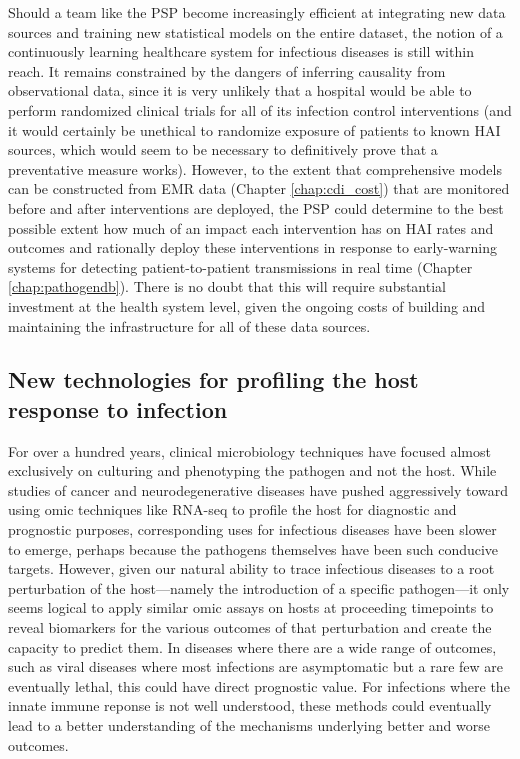 Should a team like the PSP become increasingly efficient at integrating new data sources and training new statistical models on the entire dataset, the notion of a continuously learning healthcare system for infectious diseases is still within reach. It remains constrained by the dangers of inferring causality from observational data,\autocite{Dahabreh2014} since it is very unlikely that a hospital would be able to perform randomized clinical trials for all of its infection control interventions (and it would certainly be unethical to randomize exposure of patients to known HAI sources, which would seem to be necessary to definitively prove that a preventative measure works). However, to the extent that comprehensive models can be constructed from EMR data (Chapter \ref{chap:cdi_cost}) that are monitored before and after interventions are deployed, the PSP could determine to the best possible extent how much of an impact each intervention has on HAI rates and outcomes and rationally deploy these interventions in response to early-warning systems for detecting patient-to-patient transmissions in real time (Chapter \ref{chap:pathogendb}). There is no doubt that this will require substantial investment at the health system level, given the ongoing costs of building and maintaining the infrastructure for all of these data sources.

\subsection{New technologies for profiling the host response to infection}

For over a hundred years, clinical microbiology techniques have focused almost exclusively on culturing and phenotyping the pathogen and not the host.\autocite{Didelot2012} While studies of cancer and neurodegenerative diseases have pushed aggressively toward using omic techniques like RNA-seq to profile the host for diagnostic and prognostic purposes,\autocite{Costa2012} corresponding uses for infectious diseases have been slower to emerge, perhaps because the pathogens themselves have been such conducive targets. However, given our natural ability to trace infectious diseases to a root perturbation of the host—namely the introduction of a specific pathogen—it only seems logical to apply similar omic assays on hosts at proceeding timepoints to reveal biomarkers for the various outcomes of that perturbation and create the capacity to predict them. In diseases where there are a wide range of outcomes, such as viral diseases where most infections are asymptomatic but a rare few are eventually lethal, this could have direct prognostic value. For infections where the innate immune reponse is not well understood, these methods could eventually lead to a better understanding of the mechanisms underlying better and worse outcomes.

